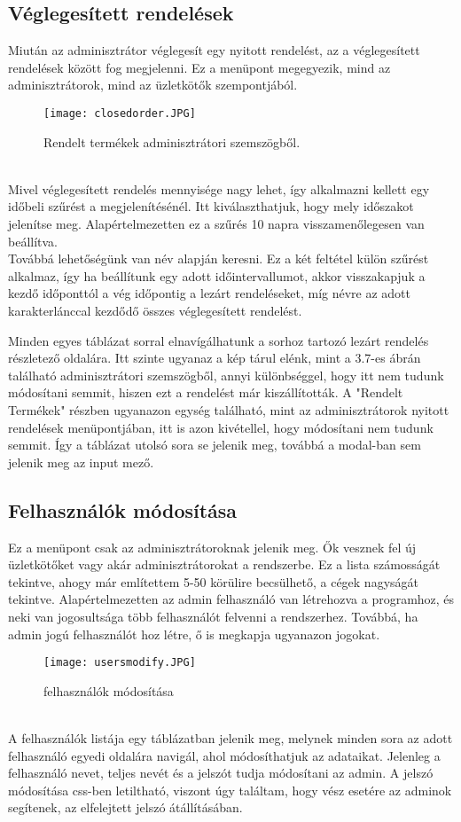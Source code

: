 \subsection{Véglegesített rendelések}
Miután az adminisztrátor véglegesít egy nyitott rendelést, az a véglegesített rendelések között fog megjelenni. Ez a menüpont megegyezik, mind az adminisztrátorok, mind az üzletkötők szempontjából. 
\begin{figure}[h]
    \centering
    \texttt{[image: closedorder.JPG]}
    \caption{Rendelt termékek adminisztrátori szemszögből.}
\end{figure}\\
Mivel véglegesített rendelés mennyisége nagy lehet, így alkalmazni kellett egy időbeli szűrést a megjelenítésénél. Itt kiválaszthatjuk, hogy mely időszakot jelenítse meg. Alapértelmezetten ez a szűrés 10 napra visszamenőlegesen van beállítva.\\
Továbbá lehetőségünk van név alapján keresni. Ez a két feltétel külön szűrést alkalmaz, így ha beállítunk egy adott időintervallumot, akkor visszakapjuk a kezdő időponttól a vég időpontig a lezárt rendeléseket, míg névre az adott karakterlánccal kezdődő összes véglegesített rendelést.

Minden egyes táblázat sorral elnavígálhatunk a sorhoz tartozó lezárt rendelés részletező oldalára. Itt szinte ugyanaz a kép tárul elénk, mint a 3.7-es ábrán található adminisztrátori szemszögből, annyi különbséggel, hogy itt nem tudunk módosítani semmit, hiszen ezt a rendelést már kiszállították. A "Rendelt Termékek" részben ugyanazon egység található, mint az adminisztrátorok nyitott rendelések menüpontjában, itt is azon kivétellel, hogy módosítani nem tudunk semmit. Így a táblázat utolsó sora se jelenik meg, továbbá a modal-ban sem jelenik meg az input mező.
\subsection{Felhasználók módosítása}
Ez a menüpont csak az adminisztrátoroknak jelenik meg. Ők vesznek fel új üzletkötőket vagy akár adminisztrátorokat a rendszerbe. Ez a lista számosságát tekintve, ahogy már említettem 5-50 körülire becsülhető, a cégek nagyságát tekintve. Alapértelmezetten az admin felhasználó van létrehozva a programhoz, és neki van jogosultsága több felhasználót felvenni a rendszerhez. Továbbá, ha admin jogú felhasználót hoz létre, ő is megkapja ugyanazon jogokat.
\begin{figure}[h]
    \centering
    \texttt{[image: usersmodify.JPG]}
    \caption{felhasználók módosítása}
\end{figure}\\
A felhasználók listája egy táblázatban jelenik meg, melynek minden sora az adott felhasználó egyedi oldalára navigál, ahol módosíthatjuk az adataikat. Jelenleg a felhasználó nevet, teljes nevét és a jelszót tudja módosítani az admin. A jelszó módosítása css-ben letiltható, viszont úgy találtam, hogy vész esetére az adminok segítenek, az elfelejtett jelszó átállításában.

